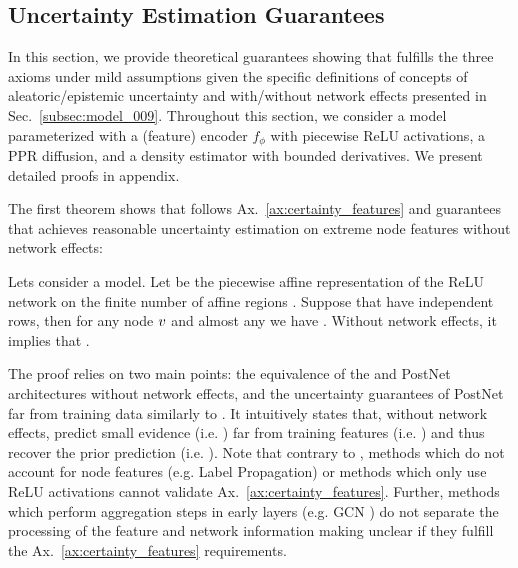 \subsection{Uncertainty Estimation Guarantees} 
\label{sec:guarantees_009}

In this section, we provide theoretical guarantees showing that \GPNacro{} fulfills the three axioms under mild assumptions given the specific definitions of concepts of aleatoric/epistemic uncertainty and with/without network effects presented in Sec.~\ref{subsec:model_009}. Throughout this section, we consider a \GPNacro{} model parameterized with a (feature) encoder $f_{\phi}$ with piecewise ReLU activations, a PPR diffusion, and a density estimator  with bounded derivatives. We present detailed proofs in appendix. 

The first theorem shows that \GPNacro{} follows Ax.~\ref{ax:certainty_features} and guarantees that \GPNacro{} achieves reasonable uncertainty estimation on extreme node features without network effects:
\begin{theorem}
\label{thm:axiom-feature}
Lets consider a \GPNacro{} model. Let  be the piecewise affine representation of the ReLU network  on the finite number of affine regions  \cite{understanding-nn-relu}. Suppose that  have independent rows, then for any node $v$ and almost any \smash{$\x\nodeidxv$} we have . Without network effects, it implies that .
\end{theorem}
The proof relies on two main points: the equivalence of the \GPNacro{} and PostNet architectures without network effects, and the uncertainty guarantees of PostNet far from training data similarly to \cite{NatPN2021}. It intuitively states that, without network effects, \GPNacro{} predict small evidence (i.e. ) far from training features (i.e. \smash{$||\delta \cdot \x\nodeidxv|| \rightarrow \infty$}) and thus recover the prior prediction (i.e. ). 
Note that contrary to \GPNacro{}, methods which do not account for node features (e.g. Label Propagation) or methods which only use ReLU activations \cite{overconfident-relu} cannot validate Ax.~\ref{ax:certainty_features}. Further, methods which perform aggregation steps in early layers (e.g. GCN \citep{Kipf2016}) do not separate the processing of the feature and network information making unclear if they fulfill the Ax.~\ref{ax:certainty_features} requirements. 

